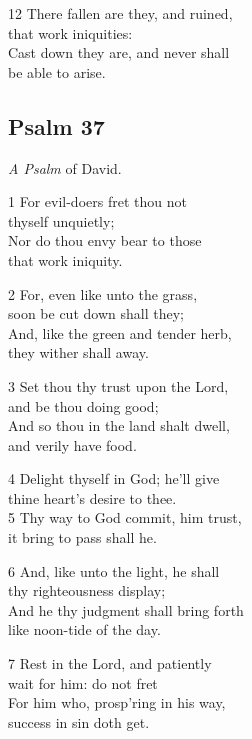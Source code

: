 12 There fallen are they, and ruined,\\
that work iniquities:\\
Cast down they are, and never shall\\
be able to arise.

\begin{center}
\quad{}\quad{}
\end{center}

\subsection*{Psalm 37 }

\emph{A Psalm} of David.

1 For evil-doers fret thou not\\
thyself unquietly;\\
Nor do thou envy bear to those\\
that work iniquity.

2 For, even like unto the grass,\\
soon be cut down shall they;\\
And, like the green and tender herb,\\
they wither shall away.

3 Set thou thy trust upon the Lord,\\
and be thou doing good;\\
And so thou in the land shalt dwell,\\
and verily have food.

4 Delight thyself in God; he’ll give\\
thine heart’s desire to thee.\\
5 Thy way to God commit, him trust,\\
it bring to pass shall he.

6 And, like unto the light, he shall\\
thy righteousness display;\\
And he thy judgment shall bring forth\\
like noon-tide of the day.

7 Rest in the Lord, and patiently\\
wait for him: do not fret\\
For him who, prosp’ring in his way,\\
success in sin doth get.


